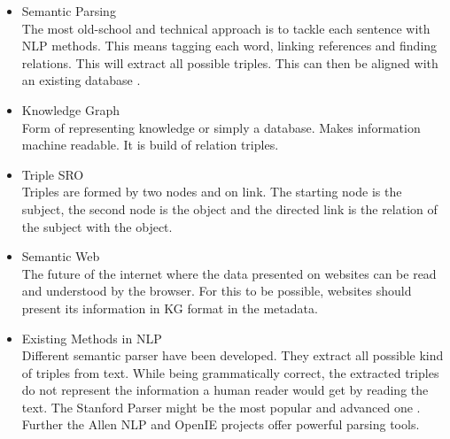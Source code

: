 \begin{itemize}
    \item Semantic Parsing\\
    The most old-school and technical approach is to tackle each sentence with NLP methods. This means tagging each word, linking references and finding relations. This will extract all possible triples. This can then be aligned with an existing database \cite{kertkeidkachorn_t2kg_2018}.
    \item Knowledge Graph\\
    Form of representing knowledge or simply a database. Makes information machine readable. It is build of relation triples.
    \item Triple SRO\\
    Triples are formed by two nodes and on link. The starting node is the subject, the second node is the object and the directed link is the relation of the subject with the object. 
    \item Semantic Web\\
    The future of the internet where the data presented on websites can be read and understood by the browser. For this to be possible, websites should present its information in KG format in the metadata.
    \item Existing Methods in NLP\\
    Different semantic parser have been developed. They extract all possible kind of triples from text. While being grammatically correct, the extracted triples do not represent the information a human reader would get by reading the text. The Stanford Parser might be the most popular and advanced one \cite{che_towards_2018}. Further the Allen NLP and OpenIE projects offer powerful parsing tools.
\end{itemize}

